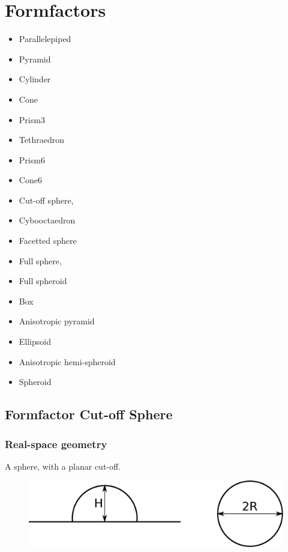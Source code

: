 \chapter{Formfactors}

\begin{itemize}
\item Parallelepiped
\item Pyramid
\item Cylinder
\item Cone
\item Prism3
\item Tethraedron
\item Prism6
\item Cone6
\item Cut-off sphere,  
\item Cybooctaedron
\item Facetted sphere  
\item Full sphere,  
\item Full spheroid 
\item Box
\item Anisotropic pyramid
\item Ellipsoid
\item Anisotropic hemi-spheroid
\item Spheroid
\end{itemize}

\newpage
\section{Formfactor Cut-off Sphere}
\subsection{Real-space geometry}

A sphere, with a planar cut-off.
\begin{figure}[!h]
\begin{center}
\includegraphics[width=0.6\columnwidth]{Figures/sphere}
\end{center}
\label{sphere}
\end{figure} 
\par
